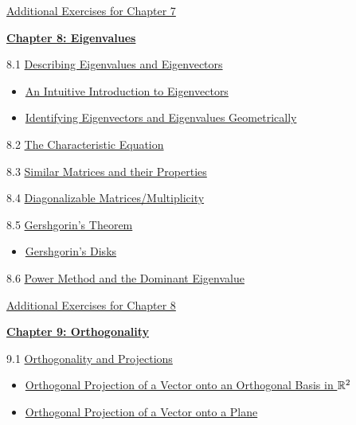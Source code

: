 \documentclass{ximera}
\begin{document}
\href{https://ximera.osu.edu/oerlinalg/LinearAlgebra/SUPX-0070/main}{Additional Exercises for Chapter 7}
	
\href{https://ximera.osu.edu/oerlinalg/LinearAlgebra/XLAChapter_eigenvalues/main}{\textbf{Chapter 8: Eigenvalues}}
	
8.1	\href{https://ximera.osu.edu/oerlinalg/LinearAlgebra/EIG-0010/main}{Describing Eigenvalues and Eigenvectors}
\begin{itemize}
    \item 
    \href{https://www.geogebra.org/m/ub4kqvmz}{An Intuitive Introduction to Eigenvectors}
    \item
    \href{https://www.geogebra.org/m/vd3fydmg}{Identifying Eigenvectors and Eigenvalues Geometrically}
\end{itemize}
	
8.2	\href{https://ximera.osu.edu/oerlinalg/LinearAlgebra/EIG-0020/main}{The Characteristic Equation}
	
8.3	\href{https://ximera.osu.edu/oerlinalg/LinearAlgebra/EIG-0040/main}{Similar Matrices and their Properties}
	
8.4	\href{https://ximera.osu.edu/oerlinalg/LinearAlgebra/EIG-0050/main}{Diagonalizable Matrices/Multiplicity}
	
8.5	\href{https://ximera.osu.edu/oerlinalg/LinearAlgebra/EIG-0080/main}{Gershgorin's Theorem}
\begin{itemize}
    \item 
    \href{https://www.geogebra.org/m/jrpqazq4}{Gershgorin's Disks}
\end{itemize}
	
8.6	\href{https://ximera.osu.edu/oerlinalg/LinearAlgebra/EIG-0070/main}{Power Method and the Dominant Eigenvalue}
	
\href{https://ximera.osu.edu/oerlinalg/LinearAlgebra/SUPX-0080/main}{Additional Exercises for Chapter 8}
	
\href{https://ximera.osu.edu/oerlinalg/LinearAlgebra/XLAChapter_orthogonality/main}{\textbf{Chapter 9: Orthogonality}}
	
9.1	\href{https://ximera.osu.edu/oerlinalg/LinearAlgebra/RTH-0010/main}{Orthogonality and Projections}
\begin{itemize}
    \item 
    \href{https://www.geogebra.org/m/nsqzhsxv}{Orthogonal Projection of a Vector onto an Orthogonal Basis in $\mathbb{R}^2$}
   \item
   \href{https://www.geogebra.org/m/hehqyayz}{Orthogonal Projection of a Vector onto a Plane}
\end{itemize}
	
\end{document}
